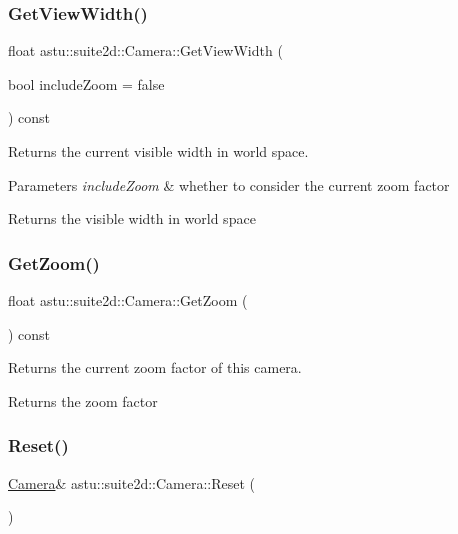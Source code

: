 \subsubsection{\texorpdfstring{Get\+View\+Width()}{GetViewWidth()}}
{\footnotesize\ttfamily float astu\+::suite2d\+::\+Camera\+::\+Get\+View\+Width (\begin{DoxyParamCaption}\item[{bool}]{include\+Zoom = {\ttfamily false} }\end{DoxyParamCaption}) const}

Returns the current visible width in world space.


\begin{DoxyParams}{Parameters}
{\em include\+Zoom} & whether to consider the current zoom factor \\
\hline
\end{DoxyParams}
\begin{DoxyReturn}{Returns}
the visible width in world space 
\end{DoxyReturn}
\mbox{\label{classastu_1_1suite2d_1_1Camera_a6866e73e4f7463b281c84f67cc3e7184}} 
\subsubsection{\texorpdfstring{Get\+Zoom()}{GetZoom()}}
{\footnotesize\ttfamily float astu\+::suite2d\+::\+Camera\+::\+Get\+Zoom (\begin{DoxyParamCaption}{ }\end{DoxyParamCaption}) const}

Returns the current zoom factor of this camera.

\begin{DoxyReturn}{Returns}
the zoom factor 
\end{DoxyReturn}
\mbox{\label{classastu_1_1suite2d_1_1Camera_a58db2b6c0e45ed32c5f06d4780940635}} 
\subsubsection{\texorpdfstring{Reset()}{Reset()}}
{\footnotesize\ttfamily \hyperlink{classastu_1_1suite2d_1_1Camera}{Camera}\& astu\+::suite2d\+::\+Camera\+::\+Reset (\begin{DoxyParamCaption}{ }\end{DoxyParamCaption})}


